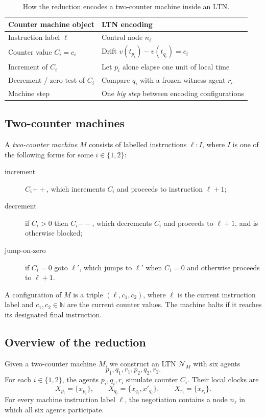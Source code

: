 \begin{table}[t]
\centering
\begin{tabular}{ll}
\hline
\textbf{Counter machine object} & \textbf{LTN encoding} \\ \hline
Instruction label $\ell$ & Control node $n_\ell$ \\
Counter value $C_i=c_i$ & Drift $v(t_{p_i})-v(t_{q_i})=c_i$ \\
Increment of $C_i$ & Let $p_i$ alone elapse one unit of local time \\
Decrement / zero-test of $C_i$ & Compare $q_i$ with a frozen witness agent $r_i$ \\
Machine step & One \emph{big step} between encoding configurations \\ \hline
\end{tabular}
\caption{How the reduction encodes a two-counter machine inside an LTN.}
\label{tab:red-dictionary}
\end{table}

\subsection{Two-counter machines}
\label{subsec:2cm}

A \emph{two-counter machine} $M$ consists of labelled instructions $\ell:I$,
where $I$ is one of the following forms for some $i\in\{1,2\}$:
\begin{description}
\item[increment] $C_i{++}$, which increments $C_i$ and proceeds to instruction
      $\ell+1$;
\item[decrement] if $C_i>0$ then $C_i{--}$, which decrements $C_i$ and proceeds
      to $\ell+1$, and is otherwise blocked;
\item[jump-on-zero] if $C_i=0$ goto $\ell'$, which jumps to $\ell'$ when
      $C_i=0$ and otherwise proceeds to $\ell+1$.
\end{description}
A configuration of $M$ is a triple $(\ell,c_1,c_2)$, where $\ell$ is the
current instruction label and $c_1,c_2\in \mathbb N$ are the current counter
values.  The machine halts if it reaches its designated final instruction.

\subsection{Overview of the reduction}
\label{subsec:red-overview}

Given a two-counter machine $M$, we construct an LTN $\mathcal N_M$ with six
agents
\[
p_1,q_1,r_1,p_2,q_2,r_2.
\]
For each $i\in\{1,2\}$, the agents $p_i,q_i,r_i$ simulate counter $C_i$.  Their
local clocks are
\[
X_{p_i}=\{x_{p_i}\},\qquad
X_{q_i}=\{x_{q_i},x'_{q_i}\},\qquad
X_{r_i}=\{x_{r_i}\}.
\]
For every machine instruction label $\ell$, the negotiation contains a node
$n_\ell$ in which all six agents participate.

